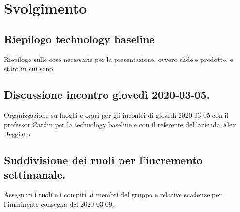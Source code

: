 \newpage
\section*{Svolgimento}

	\subsection*{Riepilogo technology baseline}
		Riepilogo sulle cose necessarie per la presentazione, ovvero slide e prodotto, e stato in cui sono.

	\subsection*{Discussione incontro giovedì 2020-03-05.}
		Organizzazione su luoghi e orari per gli incontri di giovedì 2020-03-05 con il professor Cardin per la technology baseline e con il referente dell'azienda Alex Beggiato.

	\subsection*{Suddivisione dei ruoli per l'incremento settimanale.}
		Assegnati i ruoli e i compiti ai membri del gruppo e relative scadenze per l'imminente consegna del 2020-03-09.